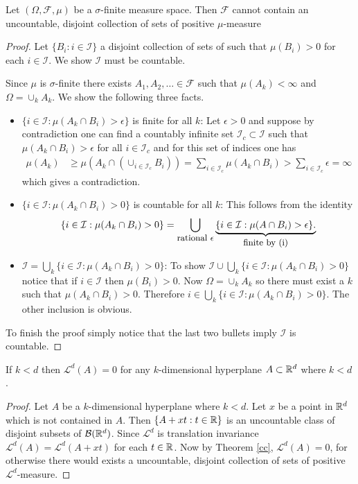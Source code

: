 \begin{theorem}
\label{cc}
Let $(\Omega, \mathcal F,\mu)$ be a $\sigma$-finite measure space. Then $\mathcal F$ cannot contain an uncountable, disjoint collection of sets of positive $\mu$-measure
\end{theorem}
\begin{proof}
Let $\{B_i: i\in \mathcal I\}$ a disjoint collection of sets of such that $\mu(B_i)>0$ for each $i\in\mathcal I$.
We show $\mathcal I$ must be countable.


Since $\mu$ is $\sigma$-finite there exists $A_1,A_2,\ldots \in\mathcal F$ such that $\mu(A_k)<\infty$ and $\Omega = \cup_k A_k$.  We show the following three facts.
\begin{itemize}
\item $\{ i\in \mathcal I: \mu(A_k\cap B_i)>\epsilon\}$ is finite for all $k$:
Let $\epsilon>0$ and suppose by contradiction one can find a countably infinite set  $\mathcal I_c\subset \mathcal I$ such that $\mu(A_k\cap B_i)>\epsilon $ for all $i\in \mathcal I_c$ and for this set of indices one has
\begin{align*}
\mu(A_k)&\geq \mu(A_k\cap (\cup_{i\in\mathcal I_c}B_i ))= \sum_{i\in\mathcal I_c}\mu(A_k\cap B_i) > \sum_{i\in\mathcal I_c}\epsilon =\infty
\end{align*}
which gives a contradiction.
\item $\{ i\in \mathcal I: \mu(A_k\cap B_i)>0\}$ is countable for all $k$:
This follows from the  identity
\[\{ i\in \mathcal I: \mu(A_k\cap B_i)>0\}=\bigcup_\text{\small rational
$\epsilon$} \underbrace{\{ i\in \mathcal I: \mu(A\cap B_i)>\epsilon\}.} _\text{\small finite by (i)}   \]
\item $\mathcal I = \bigcup_k \{ i\in \mathcal I: \mu(A_k\cap B_i)>0\}$:
 To show $\mathcal I \cup \bigcup_k \{ i\in \mathcal I: \mu(A_k\cap B_i)>0\}$ notice that  if $i\in\mathcal I$ then $\mu(B_i)>0$. Now  $\Omega =\cup_k A_k$ so there must exist a $k$ such that $\mu(A_k\cap B_i)>0$.  Therefore $i\in  \bigcup_k \{ i\in \mathcal I: \mu(A_k\cap B_i)>0\}$. The other inclusion is obvious.
\end{itemize}

 To finish the proof simply notice that the last two bullets imply $\mathcal I$ is countable.
\end{proof}


\begin{corollary}If $k<d$ then
$\mathcal L^d(A)=0$ for any $k$-dimensional hyperplane $A\subset \Bbb R^d$ where $k<d$.
\end{corollary}
\begin{proof}
Let $A$ be a $k$-dimensional hyperplane where $k<d$. Let $x$ be a point in $\Bbb R^d$ which is not  contained in $A$.
Then $\{A+xt: t\in\Bbb R\}$ is an uncountable class of disjoint subsets of $\mathcal B(\Bbb R^d)$. Since $\mathcal L^d$ is translation invariance $\mathcal L^d(A) = \mathcal L^d(A+xt)$ for each $t\in\Bbb R$. Now by Theorem \ref{cc}, $\mathcal L^d(A)=0$, for otherwise there would exists a uncountable, disjoint collection of sets of positive $\mathcal L^d$-measure.
\end{proof}






